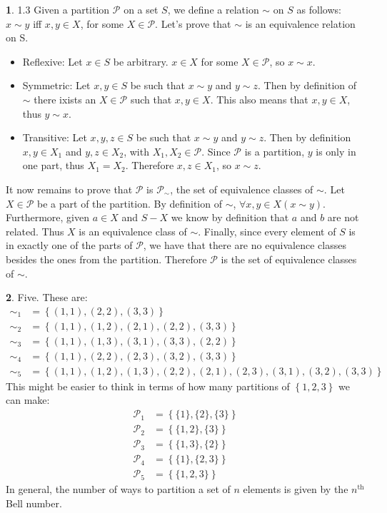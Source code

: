 \documentclass{article}
\theoremstyle{definition}
\newcommand{\PS}{\mathcal{P}}
\newcommand{\set}[1]{\left\{#1\right\}}
\theoremstyle{definition}
\theoremstyle{definition}
\newtheorem{solution-internal}{}[subsection]
\newenvironment{solution}{
  \medskip
  \begin{solution-internal}
}{
  \end{solution-internal}
}
\begin{document}
\begin{solution}
1.3 Given a partition $\mathcal{P}$ on a set $S$, we define a relation $\sim$ on
$S$ as follows: $x \sim y$ iff $x, y \in X$, for some $X \in \mathcal{P}$.
Let's prove that $\sim$ is an equivalence relation on S.
\begin{itemize}
  \item Reflexive: Let $x \in S$ be arbitrary. $x \in X$ for some $X \in
    \mathcal{P}$, so $x \sim x$.
  \item Symmetric: Let $x, y \in S$ be such that $x \sim y$ and $y \sim z$.
Then by definition of $\sim$ there ixists an $X \in \PS$ such that $x, y \in X$.
This also means that $x, y \in X$, thus $y \sim x$.
  \item Transitive: Let $x, y, z \in S$ be such that $x \sim y$ and $y \sim z$.
Then by definition $x, y \in X_1$ and $y,z \in X_2$, with $X_1, X_2 \in \PS$.
Since $\PS$ is a partition, $y$ is only in one part, thus $X_1 = X_2$. Therefore
$x, z \in X_1$, so $x \sim z$.
\end{itemize}
It now remains to prove that $\PS$ is $\PS_{\sim}$, the set of equivalence classes of $\sim$. Let $X \in \PS$ be a part of the partition. By definition of $\sim$, $\forall x, y \in X (x \sim y)$. Furthermore, given $a \in X$ and $S - X$ we know by definition that $a$ and $b$ are not related. Thus $X$ is an equivalence class of $\sim$. Finally, since every element of $S$ is in exactly one of the parts of $\PS$, we have that there are no equivalence classes besides the ones from the partition. Therefore $\PS$ is the set of equivalence classes of $\sim$.
\end{solution}

\begin{solution}
Five. These are:
\begin{align*}
  \sim_1 &= \set{(1,1), (2,2), (3,3)} \\
  \sim_2 &= \set{(1,1), (1,2), (2,1), (2,2), (3,3)} \\
  \sim_3 &= \set{(1,1), (1,3), (3,1), (3,3), (2,2)} \\
  \sim_4 &= \set{(1,1), (2,2), (2,3), (3,2), (3,3)} \\
  \sim_5 &= \set{(1,1), (1,2), (1,3), (2,2), (2,1), (2,3), (3,1), (3,2), (3,3)}
\end{align*}
This might be easier to think in terms of how many partitions of $\set{1,2,3}$ we can make:
\begin{align*}
  \PS_1 &= \set{\{1\}, \{2\}, \{3\}} \\
  \PS_2 &= \set{\{1, 2\}, \{3\}} \\
  \PS_3 &= \set{\{1, 3\}, \{2\}} \\
  \PS_4 &= \set{\{1\}, \{2, 3\}} \\
  \PS_5 &= \set{\{1, 2, 3\}}
\end{align*}
In general, the number of ways to partition a set of $n$ elements is given by the $n^{\text{th}}$ Bell number.
\end{solution}
\end{document}
